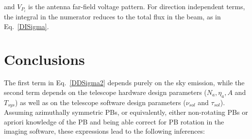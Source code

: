 \documentclass[11pt]{article}
\begin{document}
and $V_{P_i}$ is the antenna far-field voltage pattern.  For direction
independent terms, the integral in the numerator reduces to the total
flux in the beam, as in Eq.~\ref{DISigma}.

\section{Conclusions}
The first term in Eq.~\ref{DDSigma2} depends purely on the sky
emission, while the second term depends on the telescope hardware
design parameters ($N_a, \eta_a, A$ and $T_{sys}$) as well as on the
telescope software design parameters ($\nu_{sol}$ and $\tau_{sol}$).
Assuming azimuthally symmetric PBs, or equivalently, either
non-rotating PBs or apriori knowledge of the PB and being able correct
for PB rotation in the imaging software, these expressions lead to the
following inferences:
\end{document}
